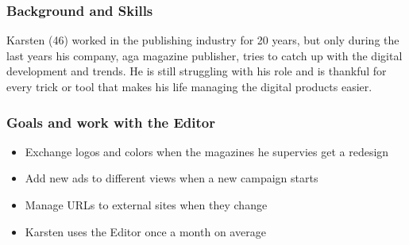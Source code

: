 \subsubsection{Background and Skills}
Karsten (46) worked in the publishing industry for 20 years, but only during the last years his company, aga magazine publisher, tries to catch up with the digital development and trends. He is still struggling with his role and is thankful for every trick or tool that makes his life managing the digital products easier.
\\
\subsubsection{Goals and work with the Editor}
\begin{itemize}
  \item Exchange logos and colors when the magazines he supervies get a redesign
  \item Add new ads to different views when a new campaign starts
  \item Manage URLs to external sites when they change
  \item Karsten uses the Editor once a month on average
\end{itemize}
